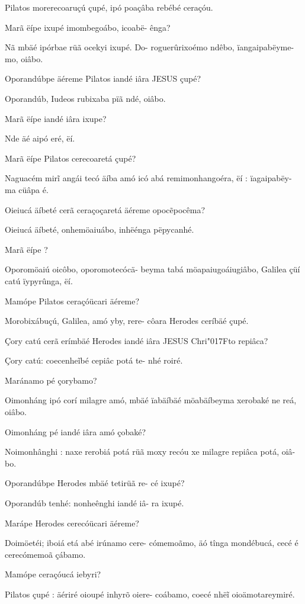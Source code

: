 \documentclass[openany,titlepage,12pt]{book}
\newcommand{\lgS}{\char"017F}
\begin{document}
\begin{altereven}
    \item Pilatos morerecoaruçú çupé, ipó poaçâba
        rebébé ceraçóu.
    \item Marã ëípe ixupé imombegoábo, icoabë-
        ênga?
    \item Nã mbäé ipórbae rüã ocekyi ixupé. Do-
        roguerûrixoémo ndêbo, ïangaipabëyme-
        mo, oiâbo.
    \item Oporandúbpe äéreme Pilatos iandé iâra
        JESUS çupé?
    \item Oporandúb, Iudeos rubixaba pïã ndé,\linebreak
        oiâbo.
    \item Marã ëípe iandé iâra ixupe?
    \item Nde äé aipó eré, ëí.
    \item Marã ëípe Pilatos cerecoaretá çupé?
    \item Naguacém mir\~i angái tecó äíba amó icó
        abá remimonhangoéra, ëí : ïagaipabëy-\linebreak
        ma cüâpa é.
    \item Oieiucá äíbeté cerã ceraçoçaretá äéreme
        opoc\~epocêma?
    \item Oieiucá äíbeté, onhemöaiuábo, inhëénga
        pëpycanhé.
    \item Marã ëípe ?
    \item Oporomöaiú oicôbo, oporomotecócä-\linebreak
        beyma tabá möapaiugoáiugiâbo, Galilea
        çüí catú ïypyrûnga, ëí.
    \item Mamópe Pilatos ceraçóücari äéreme?
    \item Morobixábuçú, Galilea, amó yby, rere-
        côara Herodes ceríbäé çupé.
    \item Çory catú cerã erímbäé Herodes iandé
        iâra JESUS Chri\lgS to repiâca?
    \item Çory catú: coecenhe\~ibé cepiâc potá te-
        nhé roiré.
    \item Maránamo pé çorybamo?
    \item Oimonháng ipó corí milagre amó, mbäé
        ïabäíbäé möabäíbeyma xerobaké ne reá,\linebreak
        oiâbo.
    \item Oimonháng pé iandé iâra amó çobaké?
    \item Noimonhânghi : naxe rerobiá potá rüã 
        moxy recóu xe milagre repiâca potá, oiâ-
        bo.
    \item Oporandúbpe Herodes mbäé tetirüã re-
        cé ixupé?
    \item Oporandúb tenhé: nonheênghi iandé iâ-
        ra ixupé.
    \item Marápe Herodes cerecóücari äéreme?
    \item Doimöetéi; iboiá etá abé irúnamo cere-
        cómemoãmo, äó tînga mondébucá, cecé
        é cerecómemoã çábamo.
    \item Mamópe ceraçóucá iebyri?
    \item Pilatos çupé : äériré oioupé inhyrõ oiere-
        coábamo, coecé nhë\~i oioämotareymiré.
\end{altereven}
\end{document}
